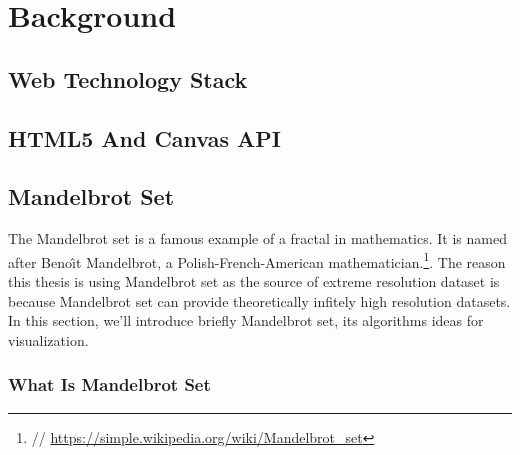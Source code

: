 
\chapter{Background} %

\label{Chapter2} %


\section{Web Technology Stack}


\section{HTML5 And Canvas API}


\section{Mandelbrot Set}

The Mandelbrot set is a famous example of a fractal in mathematics. It is named after Beno\^{\i}t Mandelbrot, a Polish-French-American mathematician.\footnote{ // \url{https://simple.wikipedia.org/wiki/Mandelbrot_set}}. The reason this thesis is using Mandelbrot set as the source of extreme resolution dataset is because Mandelbrot set can provide theoretically infitely high resolution datasets. In this section, we'll introduce briefly Mandelbrot set, its algorithms ideas for visualization.

\subsection{What Is Mandelbrot Set}

